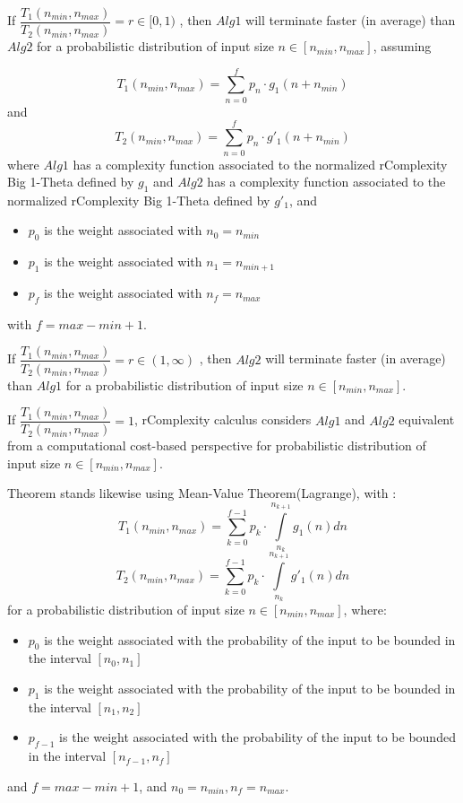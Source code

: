 \begin{theorem}
    If $ \dfrac{T_{1}(n_{min}, n_{max})}{T_{2}(n_{min}, n_{max})} = r \in [0,1) $ , then $Alg1$ will terminate faster (in average) than $Alg2$ for a probabilistic distribution of input size $n \in [n_{min}, n_{max}]$, assuming


    \[T_{1}(n_{min}, n_{max}) = \sum\limits_{n=0}^{f} p_{n} \cdot g_{1}(n + n_{min})\] and \[T_{2}(n_{min}, n_{max}) = \sum\limits_{n=0}^{f} p_{n} \cdot g'_{1}(n + n_{min})\] where $Alg1$ has a complexity function associated to the normalized rComplexity Big 1-Theta defined by $g_{1}$ and $Alg2$ has a complexity function associated to the normalized rComplexity Big 1-Theta defined by $g'_{1}$, and

    \begin{itemize}
        \item $p_{0}$ is the weight associated with $n_{0} = n_{min}$
        \item $p_{1}$ is the weight associated with $n_{1} = n_{min + 1}$
        \item $p_{f}$ is the weight associated with $n_{f} = n_{max}$
    \end{itemize}
    with $f = max - min + 1$.

\end{theorem}

\begin{corollary}
    If $ \dfrac{T_{1}(n_{min}, n_{max})}{T_{2}(n_{min}, n_{max})} = r \in (1,\infty) $ , then $Alg2$ will terminate faster (in average) than $Alg1$ for a probabilistic distribution of input size $n \in [n_{min}, n_{max}]$.
\end{corollary}

\begin{remark}
    If  $ \dfrac{T_{1}(n_{min}, n_{max})}{T_{2}(n_{min}, n_{max})} = 1$, rComplexity calculus considers $Alg1$ and $Alg2$ equivalent from a computational cost-based perspective for probabilistic distribution of input size $n \in [n_{min}, n_{max}]$.
\end{remark}

\begin{remark}
    Theorem stands likewise using Mean-Value Theorem(Lagrange), with :
    \[  T_{1}(n_{min}, n_{max}) =\sum\limits_{k=0}^{f-1} p_{k} \cdot \int\limits_{n_{k}}^{n_{k+1}} g_{1}(n) dn  \]
    \[  T_{2}(n_{min}, n_{max}) =\sum\limits_{k=0}^{f-1} p_{k} \cdot \int\limits_{n_{k}}^{n_{k+1}} g'_{1}(n) dn  \]
    for a probabilistic distribution of input size $n \in [n_{min}, n_{max}]$, where:
    \begin{itemize}
        \item $p_{0}$ is the weight associated with the probability of the input to be bounded in the interval $[n_{0}, n_{1}]$
        \item $p_{1}$ is the weight associated with the probability of the input to be bounded in the interval $[n_{1}, n_{2}]$
        \item $p_{f-1}$ is the weight associated with the probability of the input to be bounded in the interval $[n_{f-1}, n_{f}]$
    \end{itemize}
    and $f = max - min + 1$, and $n_{0} = n_{min}, n_{f} = n_{max}$.

\end{remark}